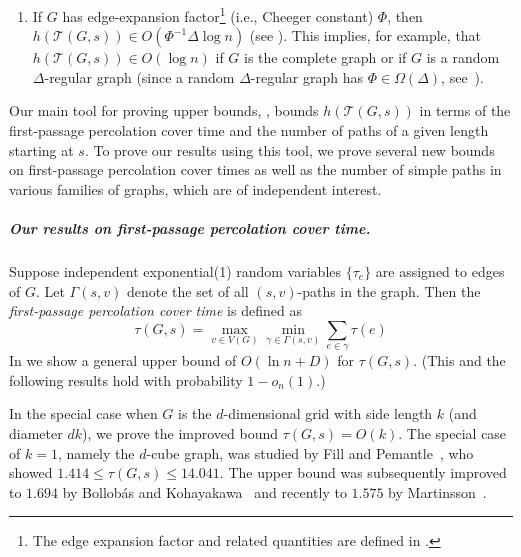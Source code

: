 \documentclass{patmorin}
\newcommand{\tcal}{\mathcal{T}}
\begin{document}
\begin{enumerate}
  \item If $G$ has edge-expansion factor\footnote{The
  edge expansion factor and related quantities are defined in
  .} (i.e., Cheeger constant) $\Phi$, then
  $h(\tcal(G,s))\in O(\Phi^{-1}\Delta\log n)$ (see ).  This implies, for example,
  that $h(\tcal(G,s))\in O(\log n)$ if $G$ is the complete graph or if $G$ is
  a random $\Delta$-regular graph (since a random $\Delta$-regular
  graph has $\Phi\in \Omega(\Delta)$, see~\cite{bollobas:isoperimetric}).
\end{enumerate}

Our main tool for proving upper bounds, , bounds
$h(\tcal(G,s))$ in terms of the first-passage percolation cover time and
the number of paths of  a given length starting at $s$.  To prove our
results using this tool, we prove several new bounds on first-passage
percolation cover times  as well as the number of simple paths in various
families of graphs, which are of independent interest.

\subparagraph{Our results on first-passage percolation cover time.}
Suppose independent exponential(1) random variables $\{\tau_e\}$ are assigned to edges of $G$.
Let $\Gamma(s,v)$ denote the set of all $(s,v)$-paths in the graph.
Then the \emph{first-passage percolation cover time} is defined as 
\[
	\tau(G,s) = \max_{v\in V(G)} \min_{\gamma\in\Gamma(s,v)} \sum_{e\in\gamma} \tau(e)
\]
In  we show a general upper bound of 
$O(\ln n + D)$ for $\tau(G,s)$. (This and the following results hold with probability $1-o_n(1)$.)

In the special case when $G$ is the $d$-dimensional grid with side length $k$ (and diameter $dk$), we prove the improved bound 
$\tau(G,s)=O(k)$.
The special case of $k=1$, namely the $d$-cube graph, was studied by Fill and Pemantle~\cite{fill.pemantle:percolation}, who showed $1.414\leq \tau(G,s)\leq 14.041$.
The upper bound was subsequently improved to
$1.694$
by Bollob\'as and Kohayakawa~\cite{bollobas.kohayakawa:on} 
and recently to $1.575$ by Martinsson~\cite{martinsson:unoriented}.

\end{document}
